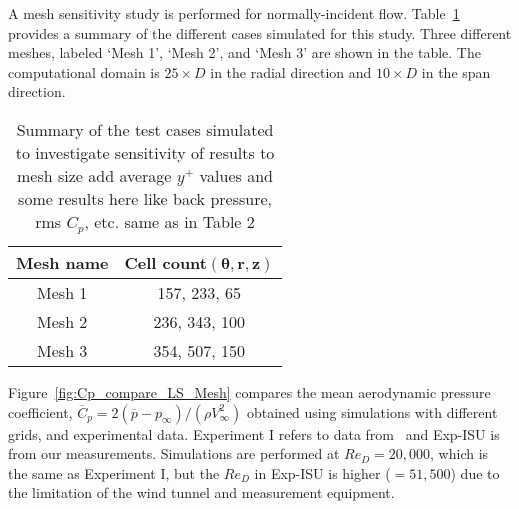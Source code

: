%
A mesh sensitivity study is performed for normally-incident flow.
Table~\ref{tab:meshSize} provides a summary of the different cases simulated
for this study. Three different meshes, labeled `Mesh 1', `Mesh 2', and `Mesh
3' are shown in the table. The computational domain is $25\times D$ in the
radial direction and $10\times D$ in the span direction.
%
\begin{table}[htb!]
  \caption{Summary of the test cases simulated to investigate sensitivity of
    results to mesh size {\color{red} add average $y^+$ values and some results
    here like back pressure, rms $C_p$, etc. same as in Table 2}} 
  \label{tab:meshSize} 
  \begin{center}
    \begin{tabular}{c|c}
      \textbf{Mesh name} &  \textbf{Cell count}$\boldsymbol{(\theta,r,z)}$ \\ \hline
      \hline
      Mesh 1 & 157, 233, 65\\ \hline
      Mesh 2 & 236, 343, 100\\ \hline
      Mesh 3 & 354, 507, 150\\ 
      \hline \hline
    \end{tabular}
  \end{center}
\end{table}

Figure~\ref{fig:Cp_compare_LS_Mesh} compares the mean aerodynamic pressure
coefficient, $\overline{C}_p=2 (\overline{p}-p_\infty)/(\rho V_\infty^2)$
obtained using simulations with different grids, and experimental data.
Experiment I refers to data from~\cite{norberg2013pressure} and Exp-ISU is from
our measurements. Simulations are performed at $Re_D=20,000$, which is the same
as Experiment I, but the $Re_D$ in Exp-ISU is higher ($=51,500$) due to the
limitation of the wind tunnel and measurement equipment.


